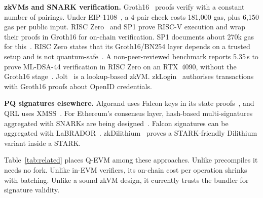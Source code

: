 \documentclass[conference]{IEEEtran}
\begin{document}
\textbf{zkVMs and SNARK verification.} Groth16~\cite{groth2016size} proofs verify with a constant number of pairings. Under EIP-1108~\cite{eip1108}, a 4-pair check costs 181,000 gas, plus 6,150 gas per public input. RISC Zero~\cite{bruestle2023risczero} and SP1 prove RISC-V execution and wrap their proofs in Groth16 for on-chain verification. SP1 documents about 270k gas for this~\cite{succinct2026sp1prooftypes}. RISC Zero states that its Groth16/BN254 layer depends on a trusted setup and is not quantum-safe~\cite{risczero2026security}. A non-peer-reviewed benchmark reports 5.35\,s to prove ML-DSA-44 verification in RISC Zero on an RTX~4090, without the Groth16 stage~\cite{kaspakii2026pqzkbench}. Jolt~\cite{arun2024jolt} is a lookup-based zkVM. zkLogin~\cite{baldimtsi2024zklogin} authorises transactions with Groth16 proofs about OpenID credentials.

\textbf{PQ signatures elsewhere.} Algorand uses Falcon keys in its state proofs~\cite{algorand2026stateproofs,micali2021compact}, and QRL uses XMSS~\cite{qrl2026docs}. For Ethereum's consensus layer, hash-based multi-signatures aggregated with SNARKs are being designed~\cite{drake2025hashbased,drake2025leansig,leanmultisig2026}. Falcon signatures can be aggregated with LaBRADOR~\cite{aardal2024labrador,sanso2026falconagg}. zkDilithium~\cite{policharla2023pqprivacypass} proves a STARK-friendly Dilithium variant inside a STARK.

Table~\ref{tab:related} places Q-EVM among these approaches. Unlike precompiles it needs no fork. Unlike in-EVM verifiers, its on-chain cost per operation shrinks with batching. Unlike a sound zkVM design, it currently trusts the bundler for signature validity.
\end{document}
